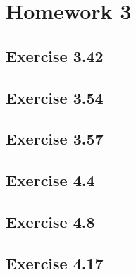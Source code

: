 \section{Homework 3}
\subsection{Exercise 3.42}

\subsection{Exercise 3.54}

\subsection{Exercise 3.57}

\subsection{Exercise 4.4}

\subsection{Exercise 4.8}

\subsection{Exercise 4.17}
